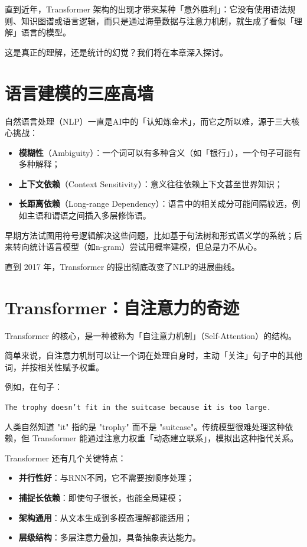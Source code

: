直到近年，Transformer 架构的出现才带来某种「意外胜利」：它没有使用语法规则、知识图谱或语言逻辑，而只是通过海量数据与注意力机制，就生成了看似「理解」语言的模型。

这是真正的理解，还是统计的幻觉？我们将在本章深入探讨。

\section*{语言建模的三座高墙}

自然语言处理（NLP）一直是AI中的「认知炼金术」，而它之所以难，源于三大核心挑战：
\begin{itemize}
\item \textbf{模糊性}（Ambiguity）：一个词可以有多种含义（如「银行」），一个句子可能有多种解释；
\item \textbf{上下文依赖}（Context Sensitivity）：意义往往依赖上下文甚至世界知识；
\item \textbf{长距离依赖}（Long-range Dependency）：语言中的相关成分可能间隔较远，例如主语和谓语之间插入多层修饰语。
\end{itemize}

早期方法试图用符号逻辑解决这些问题，比如基于句法树和形式语义学的系统；后来转向统计语言模型（如n-gram）尝试用概率建模，但总是力不从心。

直到 2017 年，Transformer 的提出彻底改变了NLP的进展曲线。

\section*{Transformer：自注意力的奇迹}

Transformer 的核心，是一种被称为「自注意力机制」（Self-Attention）的结构。

简单来说，自注意力机制可以让一个词在处理自身时，主动「关注」句子中的其他词，并按相关性赋予权重。

例如，在句子：
\begin{center}
\texttt{The trophy doesn't fit in the suitcase because \textbf{it} is too large.}
\end{center}

人类自然知道 "it" 指的是 "trophy" 而不是 "suitcase"。传统模型很难处理这种依赖，但 Transformer 能通过注意力权重「动态建立联系」，模拟出这种指代关系。

Transformer 还有几个关键特点：
\begin{itemize}
\item \textbf{并行性好}：与RNN不同，它不需要按顺序处理；
\item \textbf{捕捉长依赖}：即使句子很长，也能全局建模；
\item \textbf{架构通用}：从文本生成到多模态理解都能适用；
\item \textbf{层级结构}：多层注意力叠加，具备抽象表达能力。
\end{itemize}

